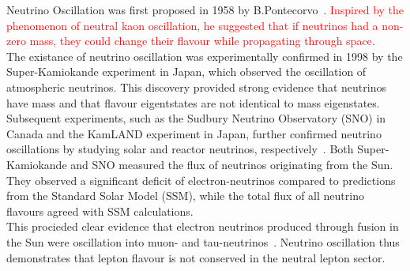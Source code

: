 Neutrino Oscillation was first proposed in 1958 by B.Pontecorvo~\cite{berger2025particle}. 
\textcolor{red}{Inspired by the phenomenon of neutral kaon oscillation, he suggested that if neutrinos had a non-zero mass, they could change their flavour while propagating through space.}
\\
The existance of neutrino oscillation was experimentally confirmed in 1998 by the Super-Kamiokande experiment in Japan, which observed the oscillation of atmospheric neutrinos. 
This discovery provided strong evidence that neutrinos have mass and that flavour eigentstates are not identical to mass eigenstates.
\\ 
Subsequent experiments, such as the Sudbury Neutrino Observatory (SNO) in Canada and the KamLAND experiment in Japan, further confirmed neutrino oscillations by studying solar and reactor neutrinos, respectively~\cite{thomson2013modern}. 
Both Super-Kamiokande and SNO measured the flux of neutrinos originating from the Sun. 
They observed a significant deficit of electron-neutrinos compared to predictions from the Standard Solar Model (SSM), while the total flux of all neutrino flavours agreed with SSM calculations. 
\\
This procieded clear evidence that electron neutrinos produced through fusion in the Sun were oscillation into muon- and tau-neutrinos~\cite{berger2025particle}\cite{demtroder2016experimental}\cite{thomson2013modern}\cite{Zuber2016discovery}.
Neutrino oscillation thus demonstrates that lepton flavour is not conserved in the neutral lepton sector.
